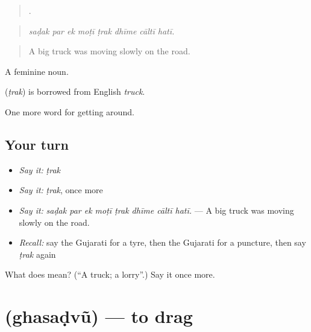 \begin{quote}
       .
\end{quote}

\begin{quote}
\emph{saḍak par ek moṭī ṭrak dhīme cāltī hatī.}
\end{quote}

\begin{quote}
A big truck was moving slowly on the road.
\end{quote}

A feminine noun.

\begin{cousinweb}
\textbf{} (\emph{ṭrak}) is borrowed from English \emph{truck}.
\end{cousinweb}

\begin{grammarlens}[title={What you've built}]
One more word for getting around.
\end{grammarlens}

\subsection*{Your turn}
\begin{itemize}
\raggedright
  \item \emph{Say it:} \emph{ṭrak}
  \item \emph{Say it:} \emph{ṭrak}, once more
  \item \emph{Say it:} \emph{saḍak par ek moṭī ṭrak dhīme cāltī hatī.} — A big truck was moving slowly on the road.
  \item \emph{Recall:} say the Gujarati for a tyre, then the Gujarati for a puncture, then say \emph{ṭrak} again
\end{itemize}

\begin{tcolorbox}[breakable,colback=teal!4,colframe=teal!35!black,title={Before you move on}]
What does  mean? (\textquotedblleft{}A truck; a lorry\textquotedblright{}.) Say it once more.
\end{tcolorbox}
\section[\texorpdfstring{\gu{ઘસડવું} (ghasaḍvũ)}{ઘસડવું (ghasaḍvũ)}]{ (ghasaḍvũ) — to drag}

\label{lesson:GU-C401-ghasadvu}



